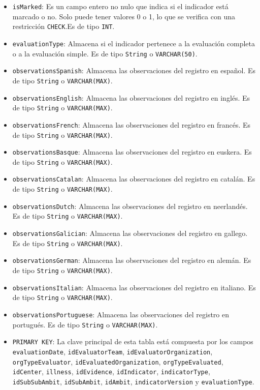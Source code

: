 \begin{itemize}
\begin{itemize}
      \item \texttt{isMarked}: Es un campo entero no nulo que indica si el indicador está marcado o no. Solo puede tener valores 0 o 1, lo que se verifica con una restricción \texttt{CHECK}.Es de tipo \texttt{INT}.
      \item \texttt{evaluationType}: Almacena si el indicador pertenece a la evaluación completa o a la evaluación simple. Es de tipo \texttt{String} o \texttt{VARCHAR(50)}.
      \item \texttt{observationsSpanish}: Almacena las observaciones del registro en español. Es de tipo \texttt{String} o \texttt{VARCHAR(MAX)}.
        \item \texttt{observationsEnglish}: Almacena las observaciones del registro en inglés. Es de tipo \texttt{String} o \texttt{VARCHAR(MAX)}.
        \item \texttt{observationsFrench}: Almacena las observaciones del registro en francés. Es de tipo \texttt{String} o \texttt{VARCHAR(MAX)}.
        \item \texttt{observationsBasque}: Almacena las observaciones del registro en euskera. Es de tipo \texttt{String} o \texttt{VARCHAR(MAX)}.
        \item \texttt{observationsCatalan}: Almacena las observaciones del registro en catalán. Es de tipo \texttt{String} o \texttt{VARCHAR(MAX)}.
        \item \texttt{observationsDutch}: Almacena las observaciones del registro en neerlandés. Es de tipo \texttt{String} o \texttt{VARCHAR(MAX)}.
        \item \texttt{observationsGalician}: Almacena las observaciones del registro en gallego. Es de tipo \texttt{String} o \texttt{VARCHAR(MAX)}.
        \item \texttt{observationsGerman}: Almacena las observaciones del registro en alemán. Es de tipo \texttt{String} o \texttt{VARCHAR(MAX)}.
        \item \texttt{observationsItalian}: Almacena las observaciones del registro en italiano. Es de tipo \texttt{String} o \texttt{VARCHAR(MAX)}.
        \item \texttt{observationsPortuguese}: Almacena las observaciones del registro en portugués. Es de tipo \texttt{String} o \texttt{VARCHAR(MAX)}.
      \item \texttt{PRIMARY KEY}: La clave principal de esta tabla está compuesta por los campos \texttt{evaluationDate}, \texttt{idEvaluatorTeam}, \texttt{idEvaluatorOrganization}, \texttt{orgTypeEvaluator}, \texttt{idEvaluatedOrganization}, \texttt{orgTypeEvaluated}, \texttt{idCenter}, \texttt{illness}, \texttt{idEvidence}, \texttt{idIndicator}, \texttt{indicatorType}, \texttt{idSubSubAmbit}, \texttt{idSubAmbit}, \texttt{idAmbit}, \texttt{indicatorVersion} y \texttt{evaluationType}.

\end{itemize}
\end{itemize}
